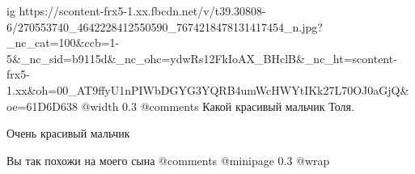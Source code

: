  
 
 
 
 

\ifcmt
  ig https://scontent-frx5-1.xx.fbcdn.net/v/t39.30808-6/270553740_4642228412550590_7674218478131417454_n.jpg?_nc_cat=100&ccb=1-5&_nc_sid=b9115d&_nc_ohc=ydwRs12FkIoAX_BHclB&_nc_ht=scontent-frx5-1.xx&oh=00_AT9ffyU1nPIWbDGYG3YQRB4umWcHWYtIKk27L70OJ0aGjQ&oe=61D6D638
  @width 0.3
  @comments%
		Какой красивый мальчик Толя.  
		
		Очень красивый мальчик

    Вы так похожи на моего сына
  @comments%
  @minipage 0.3
  @wrap \parpic[r]
\fi


